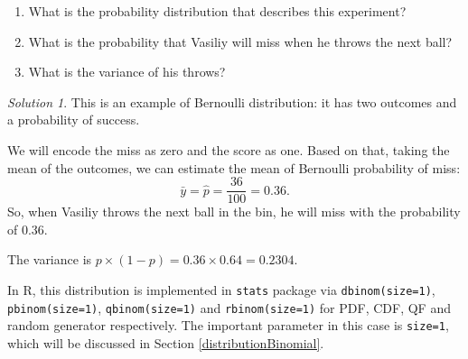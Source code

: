 \documentclass[
]{book}
\providecommand{\tightlist}{%
  \setlength{\itemsep}{0pt}\setlength{\parskip}{0pt}}
\theoremstyle{definition}
\theoremstyle{definition}
\theoremstyle{definition}
\theoremstyle{definition}
\theoremstyle{remark}
\newtheorem*{solution}{Solution}
\begin{document}
\begin{enumerate}
\def\labelenumi{\arabic{enumi}.}
\tightlist
\item
  What is the probability distribution that describes this experiment?
\item
  What is the probability that Vasiliy will miss when he throws the next ball?
\item
  What is the variance of his throws?
\end{enumerate}

\begin{solution}
This is an example of Bernoulli distribution: it has two outcomes and a probability of success.

We will encode the miss as zero and the score as one. Based on that, taking the mean of the outcomes, we can estimate the mean of Bernoulli probability of miss:
\begin{equation*}
    \bar{y} = \hat{p} = \frac{36}{100} = 0.36.
\end{equation*}
So, when Vasiliy throws the next ball in the bin, he will miss with the probability of 0.36.

The variance is \(p \times (1-p) = 0.36 \times 0.64 = 0.2304\).
\end{solution}

In R, this distribution is implemented in \texttt{stats} package via \texttt{dbinom(size=1)}, \texttt{pbinom(size=1)}, \texttt{qbinom(size=1)} and \texttt{rbinom(size=1)} for PDF, CDF, QF and random generator respectively. The important parameter in this case is \texttt{size=1}, which will be discussed in Section \ref{distributionBinomial}.
\end{document}
